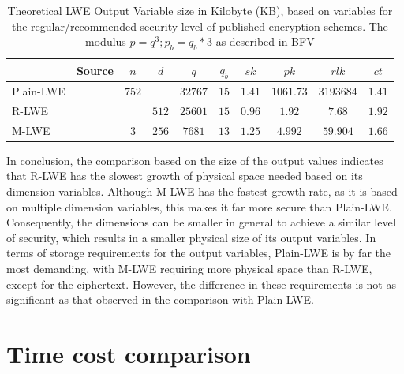 \begin{table}[htp]
  \centering
  \caption[Theoretical LWE HE output variable sizes]{Theoretical LWE Output Variable size in Kilobyte (KB), based on variables for the regular/recommended security level of published encryption schemes. The modulus $p=q^3; p_b=q_b*3$ as described in BFV}
  \begin{tabular}{|l|c||c|c|c|c||c|c|c|c|}
    \toprule
              & Source                      & $n$   & $d$   & $q$     & $q_b$ & $sk$   & $pk$      & $rlk$     & $ct$   \\
    \midrule
    Plain-LWE & \cite{frodo}                & $752$ &       & $32767$ & $15$  & $1.41$ & $1061.73$ & $3193684$ & $1.41$ \\
    R-LWE     & \cite{PracticalKeyExchange} &       & $512$ & $25601$ & $15$  & $0.96$ & $1.92$    & $7.68$    & $1.92$ \\
    M-LWE     & \cite{CyrstalsKyber}        & $3$   & $256$ & $7681$  & $13$  & $1.25$ & $4.992$   & $59.904$  & $1.66$ \\
    \bottomrule
  \end{tabular}
  \label{table:OutputVariableInKB}
\end{table}

In conclusion, the comparison based on the size of the output values indicates that R-LWE has the slowest growth of physical space needed based on its dimension variables. Although M-LWE has the fastest growth rate, as it is based on multiple dimension variables, this makes it far more secure than Plain-LWE. Consequently, the dimensions can be smaller in general to achieve a similar level of security, which results in a smaller physical size of its output variables. In terms of storage requirements for the output variables, Plain-LWE is by far the most demanding, with M-LWE requiring more physical space than R-LWE, except for the ciphertext. However, the difference in these requirements is not as significant as that observed in the comparison with Plain-LWE.

\section{Time cost comparison}

